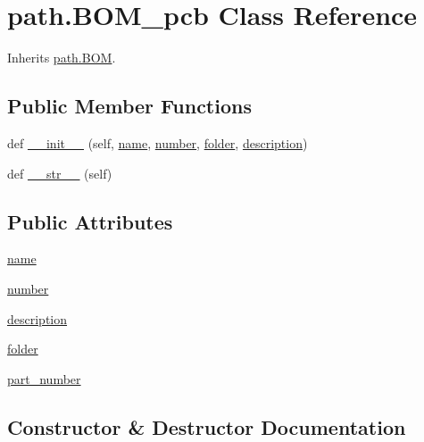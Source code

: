\hypertarget{classpath_1_1_b_o_m__pcb}{}\section{path.\+B\+O\+M\+\_\+pcb Class Reference}
\label{classpath_1_1_b_o_m__pcb}


Inherits \hyperlink{classpath_1_1_b_o_m}{path.\+B\+O\+M}.

\subsection*{Public Member Functions}
\begin{DoxyCompactItemize}
\item 
def \hyperlink{classpath_1_1_b_o_m__pcb_aa77908a6ec7721ae0de127f6a3915547}{\+\_\+\+\_\+init\+\_\+\+\_\+} (self, \hyperlink{classpath_1_1_b_o_m__pcb_a9dc2e31cb5a736091b3d89618f8050d3}{name}, \hyperlink{classpath_1_1_b_o_m__pcb_a7e12cc393a94f5172869b8b8b657deb7}{number}, \hyperlink{classpath_1_1_b_o_m__pcb_a4dfa5a017bff453b1b6fce0849c381d9}{folder}, \hyperlink{classpath_1_1_b_o_m__pcb_a51369d5f6cad39b93664837b0d8192f8}{description})
\item 
def \hyperlink{classpath_1_1_b_o_m__pcb_a799de6adfef020c0eb7a1c54351d9072}{\+\_\+\+\_\+str\+\_\+\+\_\+} (self)
\end{DoxyCompactItemize}
\subsection*{Public Attributes}
\begin{DoxyCompactItemize}
\item 
\hyperlink{classpath_1_1_b_o_m__pcb_a9dc2e31cb5a736091b3d89618f8050d3}{name}
\item 
\hyperlink{classpath_1_1_b_o_m__pcb_a7e12cc393a94f5172869b8b8b657deb7}{number}
\item 
\hyperlink{classpath_1_1_b_o_m__pcb_a51369d5f6cad39b93664837b0d8192f8}{description}
\item 
\hyperlink{classpath_1_1_b_o_m__pcb_a4dfa5a017bff453b1b6fce0849c381d9}{folder}
\item 
\hyperlink{classpath_1_1_b_o_m__pcb_a2c2a229a0f49a2c48218a775404c2ce6}{part\+\_\+number}
\end{DoxyCompactItemize}


\subsection{Constructor \& Destructor Documentation}
\hypertarget{classpath_1_1_b_o_m__pcb_aa77908a6ec7721ae0de127f6a3915547}{}
